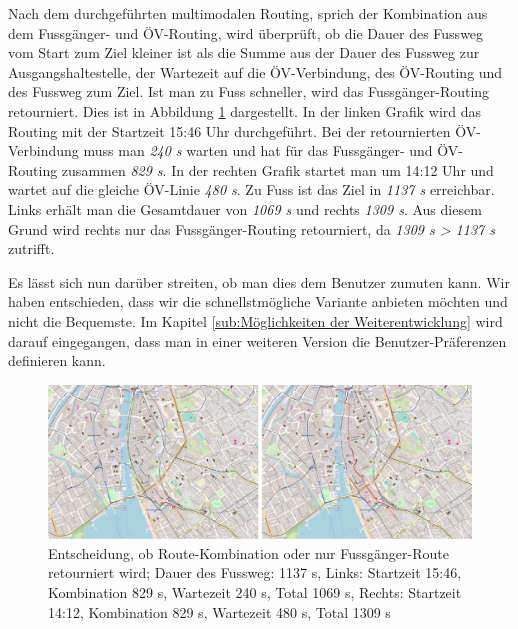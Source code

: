 Nach dem durchgeführten multimodalen Routing, sprich der Kombination aus dem Fussgänger- und ÖV-Routing, wird überprüft, ob die Dauer des Fussweg vom Start zum Ziel kleiner ist als die Summe aus der Dauer des Fussweg zur Ausgangshaltestelle, der Wartezeit auf die ÖV-Verbindung, des ÖV-Routing und des Fussweg zum Ziel. Ist man zu Fuss schneller, wird das Fussgänger-Routing retourniert. Dies ist in Abbildung \ref{fig:qgis_plugin_plaza_route_walking_public_transport_comparison} dargestellt. In der linken Grafik wird das Routing mit der Startzeit 15:46 Uhr durchgeführt. Bei der retournierten ÖV-Verbindung muss man \emph{240 s} warten und hat für das Fussgänger- und ÖV-Routing zusammen \emph{829 s}.
In der rechten Grafik startet man um 14:12 Uhr und wartet auf die gleiche ÖV-Linie \emph{480 s}. Zu Fuss ist das Ziel in \emph{1137 s} erreichbar. Links erhält man die Gesamtdauer von \emph{1069 s} und rechts \emph{1309 s}.
Aus diesem Grund wird rechts nur das Fussgänger-Routing retourniert, da \emph{1309 s > 1137 s} zutrifft.

Es lässt sich nun darüber streiten, ob man dies dem Benutzer zumuten kann. Wir haben entschieden, dass wir die schnellstmögliche Variante anbieten möchten und nicht die Bequemste.
Im Kapitel \ref{sub:Möglichkeiten der Weiterentwicklung} wird darauf eingegangen, dass man in einer weiteren Version die Benutzer-Präferenzen definieren kann.

\begin{figure}[ht]
    \centering
    \includegraphics[width=1.0\linewidth]{projectdoc/img/qgis_plugin_plaza_route_walking_public_transport_comparison}
    \caption[Entscheidung, ob Route-Kombination oder nur Fussgänger-Route retourniert wird]{Entscheidung, ob Route-Kombination oder nur Fussgänger-Route retourniert wird; Dauer des Fussweg: 1137 s, Links: Startzeit 15:46, Kombination 829 s, Wartezeit 240 s, Total 1069 s, Rechts: Startzeit 14:12, Kombination 829 s, Wartezeit 480 s, Total 1309 s}
    \label{fig:qgis_plugin_plaza_route_walking_public_transport_comparison}
\end{figure}

